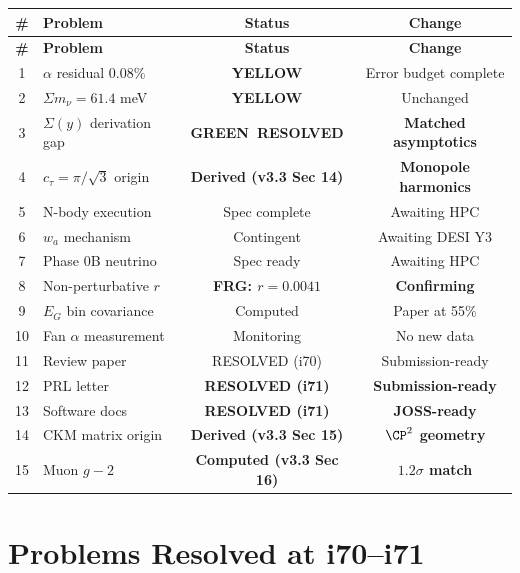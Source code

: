 \documentclass[11pt,a4paper]{article}
\newcommand{\GREEN}{\textcolor{dfdgreen}{\textbf{GREEN}}}
\newcommand{\YELLOW}{\textcolor{dfdyellow}{\textbf{YELLOW}}}
\begin{document}
\begin{center}
\begin{longtable}{clcc}
\toprule
\textbf{\#} & \textbf{Problem} & \textbf{Status} & \textbf{Change} \\
\midrule
\endfirsthead
\toprule
\textbf{\#} & \textbf{Problem} & \textbf{Status} & \textbf{Change} \\
\midrule
\endhead
1 & $\alpha$ residual 0.08\% & \YELLOW & Error budget complete \\
2 & $\Sigma m_\nu = 61.4$ meV & \YELLOW & Unchanged \\
3 & $\Sigma(y)$ derivation gap & \textbf{\GREEN\ RESOLVED} & \textbf{Matched asymptotics} \\
4 & $c_\tau = \pi/\sqrt{3}$ origin & \textbf{Derived (v3.3 Sec 14)} & \textbf{Monopole harmonics} \\
5 & N-body execution & Spec complete & Awaiting HPC \\
6 & $w_a$ mechanism & Contingent & Awaiting DESI Y3 \\
7 & Phase 0B neutrino & Spec ready & Awaiting HPC \\
8 & Non-perturbative $r$ & \textbf{FRG: $r = 0.0041$} & \textbf{Confirming} \\
9 & $E_G$ bin covariance & Computed & Paper at 55\% \\
10 & Fan $\alpha$ measurement & Monitoring & No new data \\
11 & Review paper & RESOLVED (i70) & Submission-ready \\
12 & PRL letter & \textbf{RESOLVED (i71)} & \textbf{Submission-ready} \\
13 & Software docs & \textbf{RESOLVED (i71)} & \textbf{JOSS-ready} \\
14 & CKM matrix origin & \textbf{Derived (v3.3 Sec 15)} & \textbf{$\CP^2$ geometry} \\
15 & Muon $g-2$ & \textbf{Computed (v3.3 Sec 16)} & \textbf{$1.2\sigma$ match} \\
\bottomrule
\end{longtable}
\end{center}


\section{Problems Resolved at i70--i71}
\end{document}
